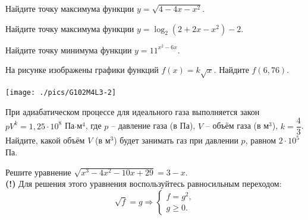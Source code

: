 \begin{class}[number=3]
\begin{listofex}
	\item Найдите точку максимума функции \( y=\sqrt{4-4x-x^2} \).
	\item Найдите точку максимума функции \( y=\log_2(2+2x-x^2)-2 \).
	\item Найдите точку минимума функции \( y=11^{x^2-6x} \).
	\item 
	\begin{minipage}[t]{0.67\textwidth}
		На рисунке изображены графики функций \( f(x)=k\sqrt{x} \). Найдите \( f(6,76) \).
	\end{minipage}
	\begin{minipage}[c]{0.25\textwidth}
		\texttt{[image: ./pics/G102M4L3-2]}
	\end{minipage}
	\item При адиабатическом процессе для идеального газа выполняется закон \( pV^k=1,25 \cdot 10^8 \) Па\( \cdot \)м\( ^4 \), где \( p \) – давление газа (в Па), \( V \) – объём газа (в м\( ^3 \)), \( k=\dfrac{4}{3}\). Найдите, какой объём \( V \) (в м\( ^3 \)) будет занимать газ при давлении \( p \), равном \( 2 \cdot 10^5 \) Па.
	\item Решите уравнение \( \sqrt{x^3-4x^2-10x+29}=3-x \).\\
	\textbf{(!)} Для решения этого уравнения воспользуйтесь равносильным переходом:
	\[ \sqrt{f}=g
	\Rightarrow
	\left\{
	\begin{array}{l}
		f=g^2,\\
		g\ge0.
	\end{array}
	\right. \]
\end{listofex}
\end{class}
%
%
%
%
%
